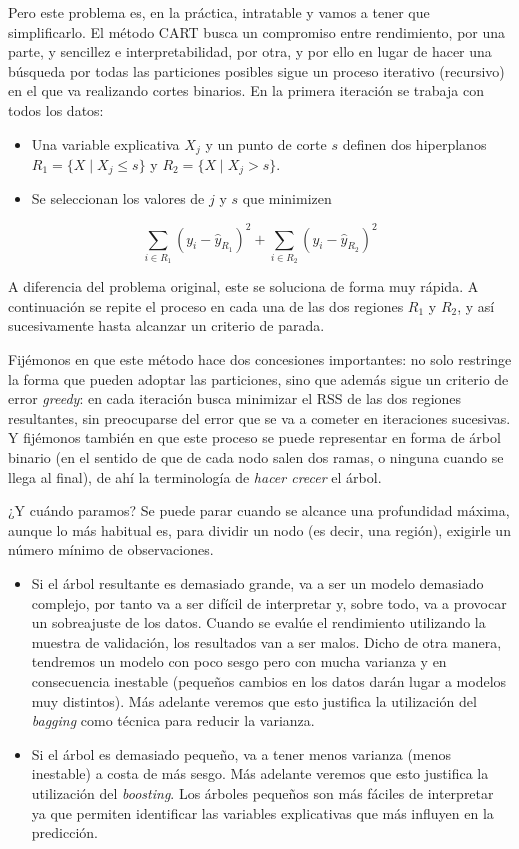 \documentclass[]{book}
\theoremstyle{break}
\theoremstyle{definition}
\theoremstyle{definition}
\theoremstyle{definition}
\theoremstyle{remark}
\begin{document}
Pero este problema es, en la práctica, intratable y vamos a tener que
simplificarlo. El método CART busca un compromiso entre rendimiento, por
una parte, y sencillez e interpretabilidad, por otra, y por ello en
lugar de hacer una búsqueda por todas las particiones posibles sigue un
proceso iterativo (recursivo) en el que va realizando cortes binarios.
En la primera iteración se trabaja con todos los datos:

\begin{itemize}
\item
  Una variable explicativa \(X_j\) y un punto de corte \(s\) definen dos
  hiperplanos \(R_1 = \{ X \mid X_j \le s \}\) y
  \(R_2 = \{ X \mid X_j > s \}\).
\item
  Se seleccionan los valores de \(j\) y \(s\) que minimizen
\end{itemize}

\[ \sum_{i\in R_1} (y_i - \widehat y_{R_1})^2 + \sum_{i\in R_2} (y_i - \widehat y_{R_2})^2\]

A diferencia del problema original, este se soluciona de forma muy
rápida. A continuación se repite el proceso en cada una de las dos
regiones \(R_1\) y \(R_2\), y así sucesivamente hasta alcanzar un
criterio de parada.

Fijémonos en que este método hace dos concesiones importantes: no solo
restringe la forma que pueden adoptar las particiones, sino que además
sigue un criterio de error \emph{greedy}: en cada iteración busca
minimizar el RSS de las dos regiones resultantes, sin preocuparse del
error que se va a cometer en iteraciones sucesivas. Y fijémonos también
en que este proceso se puede representar en forma de árbol binario (en
el sentido de que de cada nodo salen dos ramas, o ninguna cuando se
llega al final), de ahí la terminología de \emph{hacer crecer} el árbol.

¿Y cuándo paramos? Se puede parar cuando se alcance una profundidad
máxima, aunque lo más habitual es, para dividir un nodo (es decir, una
región), exigirle un número mínimo de observaciones.

\begin{itemize}
\item
  Si el árbol resultante es demasiado grande, va a ser un modelo
  demasiado complejo, por tanto va a ser difícil de interpretar y, sobre
  todo, va a provocar un sobreajuste de los datos. Cuando se evalúe el
  rendimiento utilizando la muestra de validación, los resultados van a
  ser malos. Dicho de otra manera, tendremos un modelo con poco sesgo
  pero con mucha varianza y en consecuencia inestable (pequeños cambios
  en los datos darán lugar a modelos muy distintos). Más adelante
  veremos que esto justifica la utilización del \emph{bagging} como
  técnica para reducir la varianza.
\item
  Si el árbol es demasiado pequeño, va a tener menos varianza (menos
  inestable) a costa de más sesgo. Más adelante veremos que esto
  justifica la utilización del \emph{boosting}. Los árboles pequeños son
  más fáciles de interpretar ya que permiten identificar las variables
  explicativas que más influyen en la predicción.
\end{itemize}
\end{document}
